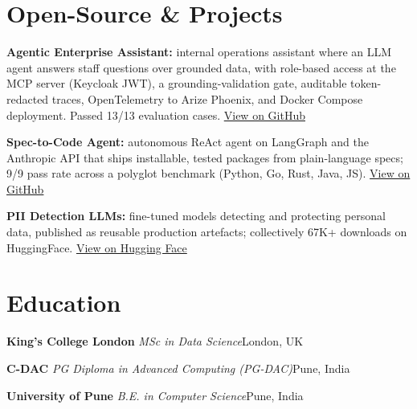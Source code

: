 \documentclass[10pt,a4paper]{article}
\newcommand{\sep}{\,\textcolor{accent!60}{\textbar}\,}
\begin{document}
\section{Open-Source \& Projects}
\begin{tight}
  \item \textbf{Agentic Enterprise Assistant:} internal operations assistant where an LLM agent answers staff questions over grounded data, with role-based access at the MCP server (Keycloak JWT), a grounding-validation gate, auditable token-redacted traces, OpenTelemetry to Arize Phoenix, and Docker Compose deployment. Passed 13/13 evaluation cases. \href{https://github.com/abhijeetscode/Agentic-Enterprise-Assistant}{View on GitHub}
  \item \textbf{Spec-to-Code Agent:} autonomous ReAct agent on LangGraph and the Anthropic API that ships installable, tested packages from plain-language specs; 9/9 pass rate across a polyglot benchmark (Python, Go, Rust, Java, JS). \href{https://github.com/abhijeetscode/Spec-to-Code-Agent}{View on GitHub}
  \item \textbf{PII Detection LLMs:} fine-tuned models detecting and protecting personal data, published as reusable production artefacts; collectively 67K+ downloads on HuggingFace. \href{https://huggingface.co/ab-ai/pii_model}{View on Hugging Face}
\end{tight}

\section{Education}
{\color{company}\bfseries King's College London}\sep{\itshape MSc in Data Science}\hfill {\color{muted}London, UK}\par\vspace{1pt}
{\color{company}\bfseries C-DAC}\sep{\itshape PG Diploma in Advanced Computing (PG-DAC)}\hfill {\color{muted}Pune, India}\par\vspace{1pt}
{\color{company}\bfseries University of Pune}\sep{\itshape B.E. in Computer Science}\hfill {\color{muted}Pune, India}\par
\end{document}

